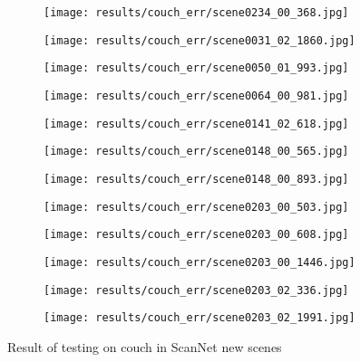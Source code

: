\begin{figure}[h!]
  \centering
  \begin{subfigure}[b]{0.32\linewidth}
    \texttt{[image: results/couch\_err/scene0234\_00\_368.jpg]}
  \end{subfigure}
  \begin{subfigure}[b]{0.32\linewidth}
    \texttt{[image: results/couch\_err/scene0031\_02\_1860.jpg]}
  \end{subfigure}
  \begin{subfigure}[b]{0.32\linewidth}
    \texttt{[image: results/couch\_err/scene0050\_01\_993.jpg]}
  \end{subfigure}
  \begin{subfigure}[b]{0.32\linewidth}
    \texttt{[image: results/couch\_err/scene0064\_00\_981.jpg]}
  \end{subfigure}
  \begin{subfigure}[b]{0.32\linewidth}
    \texttt{[image: results/couch\_err/scene0141\_02\_618.jpg]}
  \end{subfigure}
  \begin{subfigure}[b]{0.32\linewidth}
    \texttt{[image: results/couch\_err/scene0148\_00\_565.jpg]}
  \end{subfigure}
  \begin{subfigure}[b]{0.32\linewidth}
    \texttt{[image: results/couch\_err/scene0148\_00\_893.jpg]}
  \end{subfigure}
  \begin{subfigure}[b]{0.32\linewidth}
    \texttt{[image: results/couch\_err/scene0203\_00\_503.jpg]}
  \end{subfigure}
  \begin{subfigure}[b]{0.32\linewidth}
    \texttt{[image: results/couch\_err/scene0203\_00\_608.jpg]}
  \end{subfigure}
  \begin{subfigure}[b]{0.32\linewidth}
    \texttt{[image: results/couch\_err/scene0203\_00\_1446.jpg]}
  \end{subfigure}
  \begin{subfigure}[b]{0.32\linewidth}
    \texttt{[image: results/couch\_err/scene0203\_02\_336.jpg]}
  \end{subfigure}
  \begin{subfigure}[b]{0.32\linewidth}
    \texttt{[image: results/couch\_err/scene0203\_02\_1991.jpg]}
  \end{subfigure}
  \caption{Result of testing on couch in ScanNet new scenes}
  \label{fig:result_couch_gt_err}
\end{figure}